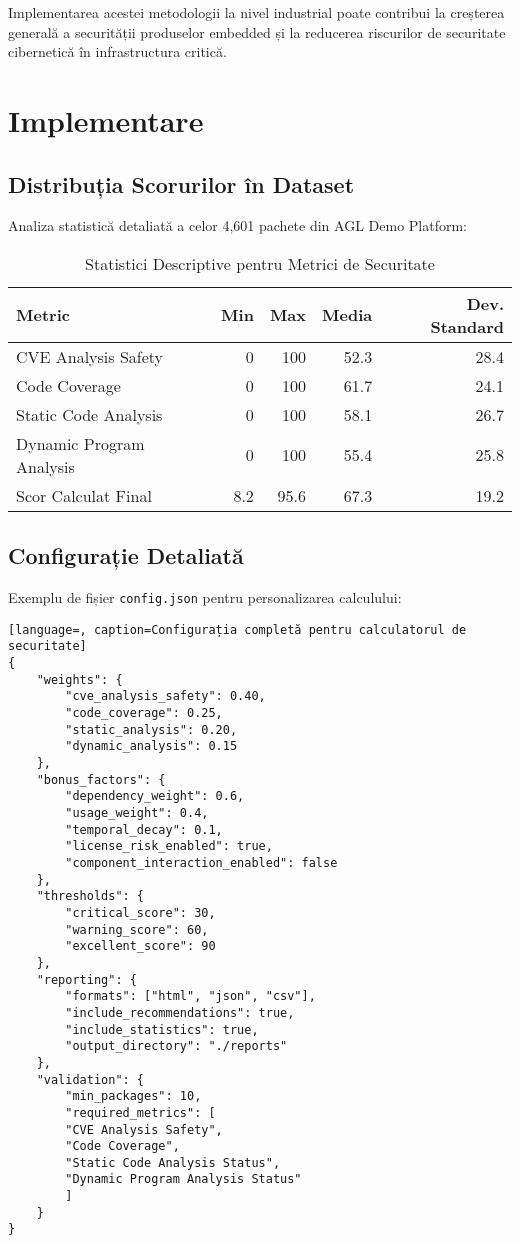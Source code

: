 \documentclass[12pt,a4paper]{article}
\begin{document}
Implementarea acestei metodologii la nivel industrial poate contribui la creșterea generală a securității produselor embedded și la reducerea riscurilor de securitate cibernetică în infrastructura critică.

\newpage

\section{Implementare}

\subsection{Distribuția Scorurilor în Dataset}

Analiza statistică detaliată a celor 4,601 pachete din AGL Demo Platform:

\begin{table}[H]
\centering
\caption{Statistici Descriptive pentru Metrici de Securitate}
\begin{tabular}{@{}lrrrr@{}}
\toprule
\textbf{Metric} & \textbf{Min} & \textbf{Max} & \textbf{Media} & \textbf{Dev. Standard} \\
\midrule
CVE Analysis Safety & 0 & 100 & 52.3 & 28.4 \\
Code Coverage & 0 & 100 & 61.7 & 24.1 \\
Static Code Analysis & 0 & 100 & 58.1 & 26.7 \\
Dynamic Program Analysis & 0 & 100 & 55.4 & 25.8 \\
Scor Calculat Final & 8.2 & 95.6 & 67.3 & 19.2 \\
\bottomrule
\end{tabular}
\end{table}

\subsection{Configurație Detaliată}

Exemplu de fișier \texttt{config.json} pentru personalizarea calculului:

\begin{lstlisting}[language=, caption=Configurația completă pentru calculatorul de securitate]
{
    "weights": {
        "cve_analysis_safety": 0.40,
        "code_coverage": 0.25,
        "static_analysis": 0.20,
        "dynamic_analysis": 0.15
    },
    "bonus_factors": {
        "dependency_weight": 0.6,
        "usage_weight": 0.4,
        "temporal_decay": 0.1,
        "license_risk_enabled": true,
        "component_interaction_enabled": false
    },
    "thresholds": {
        "critical_score": 30,
        "warning_score": 60,
        "excellent_score": 90
    },
    "reporting": {
        "formats": ["html", "json", "csv"],
        "include_recommendations": true,
        "include_statistics": true,
        "output_directory": "./reports"
    },
    "validation": {
        "min_packages": 10,
        "required_metrics": [
        "CVE Analysis Safety",
        "Code Coverage",
        "Static Code Analysis Status",
        "Dynamic Program Analysis Status"
        ]
    }
}
\end{lstlisting}
\end{document}

